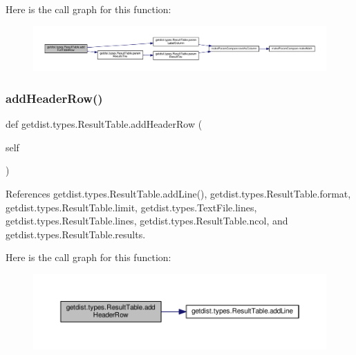 Here is the call graph for this function\+:
\nopagebreak
\begin{figure}[H]
\begin{center}
\leavevmode
\includegraphics[width=350pt]{classgetdist_1_1types_1_1ResultTable_aa355a2d81bd343f2b76bd9e0a16a88af_cgraph}
\end{center}
\end{figure}
\mbox{\label{classgetdist_1_1types_1_1ResultTable_a28c08230c64a8509fe2f98dbe91487c2}} 
\subsubsection{\texorpdfstring{add\+Header\+Row()}{addHeaderRow()}}
{\footnotesize\ttfamily def getdist.\+types.\+Result\+Table.\+add\+Header\+Row (\begin{DoxyParamCaption}\item[{}]{self }\end{DoxyParamCaption})}



References getdist.\+types.\+Result\+Table.\+add\+Line(), getdist.\+types.\+Result\+Table.\+format, getdist.\+types.\+Result\+Table.\+limit, getdist.\+types.\+Text\+File.\+lines, getdist.\+types.\+Result\+Table.\+lines, getdist.\+types.\+Result\+Table.\+ncol, and getdist.\+types.\+Result\+Table.\+results.

Here is the call graph for this function\+:
\nopagebreak
\begin{figure}[H]
\begin{center}
\leavevmode
\includegraphics[width=350pt]{classgetdist_1_1types_1_1ResultTable_a28c08230c64a8509fe2f98dbe91487c2_cgraph}
\end{center}
\end{figure}
\mbox{\label{classgetdist_1_1types_1_1ResultTable_a3f3e2d577f045de380ac50e1f3c21483}} 
